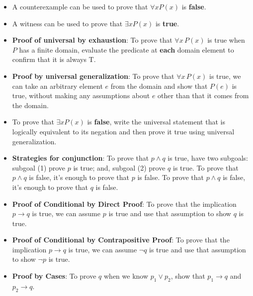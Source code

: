 \begin{itemize}
    \item A counterexample can be used to prove that  $\forall x P(x)$ is {\bf false}.
    \item  A witness can be used  to  prove that  $\exists x P(x)$ is {\bf true}.
    \item {\bf Proof of universal by exhaustion}: To prove that $\forall x \, P(x)$
is true when $P$ has a finite domain, evaluate the predicate at {\bf each} domain element to confirm that it is always T.
    \item  {\bf Proof by universal generalization}: To prove that $\forall x \, P(x)$
is true, we can take an arbitrary element $e$ from the domain and show that $P(e)$ is true, without making any assumptions about $e$ other than that it comes from the domain.
    \item To  prove  that $\exists x P(x)$ is {\bf false}, write the universal statement that is logically equivalent to its negation and then prove it true using universal generalization.
    \item {\bf Strategies for conjunction}: To prove that $p \land q$ is true, have two subgoals: subgoal (1) prove $p$ 
is  true; and, subgoal (2) prove $q$ is true. To prove that $p \land q$ is false, it's enough to prove that $p$ is false.
 To prove that $p \land q$ is false, it's enough to prove that $q$ is false.
    \item {\bf Proof of Conditional by Direct Proof}: To prove that the implication $p \to q$ is true, we can assume $p$ is true and use that assumption to show $q$ is true.
    \item {\bf Proof of Conditional by Contrapositive Proof}: To prove that the implication $p \to q$ is true, we can assume $\neg q$ is true and use that assumption to show $\neg p$ is true.
    \item {\bf Proof by Cases}: To prove $q$ when we know $p_1 \lor p_2$, show that $p_1 \to q$ and $p_2 \to q$.
\end{itemize}



